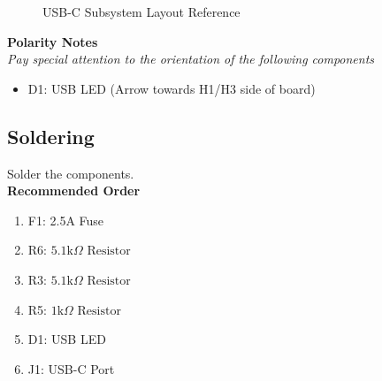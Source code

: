 \documentclass{article}
\newcommand{\resistor}[1]{$\text{#1} \Omega \text{ Resistor}$}
\begin{document}
\begin{figure}[H]
    \centering
        \qquad
        \caption{USB-C Subsystem Layout Reference}%
    \label{fig:usbc-layout}%
\end{figure}

\noindent \textbf{Polarity Notes}\\
\noindent \textit{Pay special attention to the orientation of the following components}
\begin{itemize}
  \item D1: USB LED (Arrow towards H1/H3 side of board)
\end{itemize}

\subsection{Soldering}

Solder the components. \\

\noindent \textbf{Recommended Order}

\begin{enumerate}
  \item F1: 2.5A Fuse
  \item R6: \resistor{5.1k}
  \item R3: \resistor{5.1k}
  \item R5: \resistor{1k}
  \item D1: USB LED
  \item J1: USB-C Port
\end{enumerate}
\end{document}
